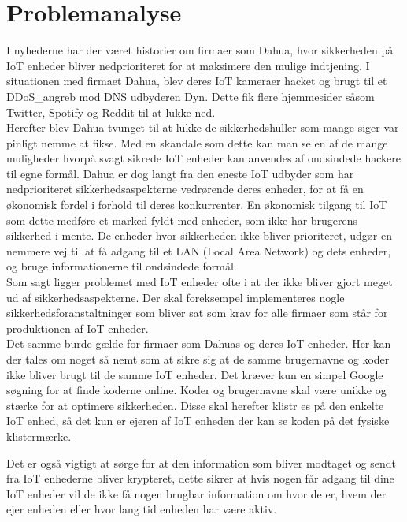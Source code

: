 \section{Problemanalyse}
    I nyhederne har der været historier om firmaer som Dahua, hvor sikkerheden på IoT enheder bliver nedprioriteret for at maksimere den mulige indtjening. I situationen med firmaet Dahua, blev deres IoT kameraer hacket og brugt til et \Gls{DDoS_angreb} mod DNS udbyderen Dyn. Dette fik flere hjemmesider såsom Twitter, Spotify og Reddit til at lukke ned. \\ 
    Herefter blev Dahua tvunget til at lukke de sikkerhedshuller som mange siger var pinligt nemme at fikse. Med en skandale som dette kan man se en af de mange muligheder hvorpå svagt sikrede IoT enheder kan anvendes af ondsindede hackere til egne formål. Dahua er dog langt fra den eneste IoT udbyder som har nedprioriteret sikkerhedsaspekterne vedrørende deres enheder, for at få en økonomisk fordel i forhold til deres konkurrenter. En økonomisk tilgang til IoT som dette medføre et marked fyldt med enheder, som ikke har brugerens sikkerhed i mente. De enheder hvor sikkerheden ikke bliver prioriteret, udgør en nemmere vej til at få adgang til et LAN (Local Area Network) og dets enheder, og bruge informationerne til ondsindede formål.  
    \autocite{Androidauthority}\\
    
    Som sagt ligger problemet med IoT enheder ofte i at der ikke bliver gjort meget ud af sikkerhedsaspekterne. Der skal foreksempel implementeres nogle sikkerhedsforanstaltninger som bliver sat som krav for alle firmaer som står for produktionen af IoT enheder.\\ 
    Det samme burde gælde for firmaer som Dahuas og deres IoT enheder. 
    Her kan der tales om noget så nemt som at sikre sig at de samme brugernavne og koder ikke bliver brugt til de samme IoT enheder. Det kræver kun en simpel Google søgning for at finde koderne online. Koder og brugernavne skal være unikke og stærke for at optimere sikkerheden. Disse skal herefter klistr es på den enkelte IoT enhed, så det kun er ejeren af IoT enheden der kan se koden på det fysiske klistermærke. 
    
    Det er også vigtigt at sørge for at den information som bliver modtaget og sendt fra IoT enhederne bliver krypteret, dette sikrer at hvis nogen får adgang til dine IoT enheder vil de ikke få nogen brugbar information om hvor de er, hvem der ejer enheden eller hvor lang tid enheden har være aktiv. 
    
